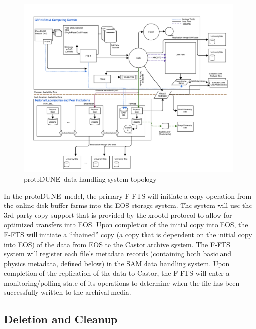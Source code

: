 \documentclass[pdftex,12pt,letter]{article}
\newcommand{\pd}{protoDUNE\ }
\begin{document}
\begin{figure}[tbh]
\centering\includegraphics[width=0.99\linewidth]{protDune-datahandling-topology.png}
\caption{\label{fig:sys_topology}\pd data handling system topology}
\end{figure}
In the \pd model, the primary F-FTS will initiate a copy operation from the online disk buffer farms into the EOS storage system. 
The system will use the 3rd party copy support that is provided by the xrootd protocol to allow for optimized transfers into EOS. 
Upon completion of the initial copy into EOS, the F-FTS will initiate a ``chained'' copy (a copy that is dependent on the initial copy into EOS)
of the data from EOS to the Castor archive system.  The F-FTS system will register each file’s metadata records (containing both basic and
physics metadata, defined below)  in the SAM data handling system.  Upon completion of the replication of the data to Castor,
the F-FTS will enter a monitoring/polling state of its operations to determine when the file has been successfully written to the archival media.

\subsection{Deletion and Cleanup}
\end{document}
